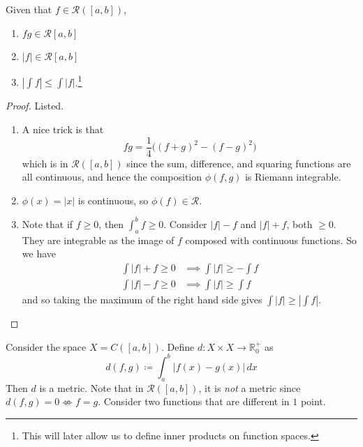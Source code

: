   \begin{theorem}
    Given that $f \in \mathcal{R}([a, b])$, 
    \begin{enumerate}
      \item $fg \in \mathcal{R}[a, b]$
      \item $|f| \in \mathcal{R}[a, b]$
      \item $| \int f | \leq \int |f|$.\footnote{This will later allow us to define inner products on function spaces.} 
    \end{enumerate}
  \end{theorem}
  \begin{proof}
    Listed. 
    \begin{enumerate}
      \item A nice trick is that 
        \begin{equation}
          fg = \frac{1}{4} \big( (f + g)^2 - (f - g)^2 \big) 
        \end{equation}
        which is in $\mathcal{R}([a, b])$ since the sum, difference, and squaring functions are all continuous, and hence the composition $\phi(f, g)$ is Riemann integrable. 

      \item $\phi(x) = |x|$ is continuous, so $\phi(f) \in \mathcal{R}$. 
      \item Note that if $f \geq 0$, then $\int_a^b f \geq 0$. Consider $|f| - f$ and $|f| + f$, both $\geq 0$. They are integrable as the image of $f$ composed with continuous functions. So we have 
        \begin{align}
          \int |f| + f \geq 0 & \implies \int |f| \geq - \int f \\ 
          \int |f| - f \geq 0 & \implies \int |f| \geq \int f
        \end{align}
        and so taking the maximum of the right hand side gives $\int |f| \geq | \int f|$. 
    \end{enumerate}
  \end{proof} 

  \begin{example}
    Consider the space $X = C([a, b])$. Define $d: X \times X \to \mathbb{R}_0^+$ as 
    \begin{equation}
      d(f, g) \coloneqq \int_a^b |f(x) - g(x)| \,dx
    \end{equation}
    Then $d$ is a metric. Note that in $\mathcal{R}([a, b])$, it is \textit{not} a metric since $d(f, g) = 0 \not\iff f = g$. Consider two functions that are different in $1$ point. 
  \end{example}


